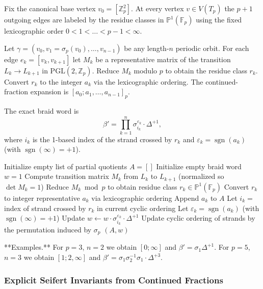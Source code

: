 \documentclass[11pt,a4paper]{amsart}
\begin{document}
Fix the canonical base vertex \(v_0 = [\mathbb{Z}_p^2]\). At every vertex \(v \in V(T_p)\) the \(p+1\) outgoing edges are labeled by the residue classes in \(\mathbb{P}^1(\mathbb{F}_p)\) using the fixed lexicographic order \(0 < 1 < \dots < p-1 < \infty\).

Let \(\gamma = (v_0, v_1 = \sigma_p(v_0), \dots, v_{n-1})\) be any length-\(n\) periodic orbit. For each edge \(e_k = [v_k, v_{k+1}]\) let \(M_k\) be a representative matrix of the transition \(L_k \to L_{k+1}\) in \(\mathrm{PGL}(2,\mathbb{Z}_p)\). Reduce \(M_k\) modulo \(p\) to obtain the residue class \(r_k\). Convert \(r_k\) to the integer \(a_k\) via the lexicographic ordering. The continued-fraction expansion is \([a_0; a_1, \dots, a_{n-1}]_p\).

The exact braid word is
\[
\beta' = \prod_{k=1}^n \sigma_{i_k}^{\varepsilon_k} \cdot \Delta^{+1},
\]
where \(i_k\) is the 1-based index of the strand crossed by \(r_k\) and \(\varepsilon_k = \operatorname{sgn}(a_k)\) (with \(\operatorname{sgn}(\infty)=+1\)).

\begin{algorithmic}[1]
  \State Initialize empty list of partial quotients \(A = []\)
  \State Initialize empty braid word \(w = 1\)
    \State Compute transition matrix \(M_k\) from \(L_k\) to \(L_{k+1}\) (normalized so \(\det M_k = 1\))
    \State Reduce \(M_k \bmod p\) to obtain residue class \(r_k \in \mathbb{P}^1(\mathbb{F}_p)\)
    \State Convert \(r_k\) to integer representative \(a_k\) via lexicographic ordering
    \State Append \(a_k\) to \(A\)
    \State Let \(i_k =\) index of strand crossed by \(r_k\) in current cyclic ordering
    \State Let \(\varepsilon_k = \operatorname{sgn}(a_k)\) (with \(\operatorname{sgn}(\infty)=+1\))
    \State Update \(w \leftarrow w \cdot \sigma_{i_k}^{\varepsilon_k} \cdot \Delta^{+1}\)
    \State Update cyclic ordering of strands by the permutation induced by \(\sigma_p\)
  \EndFor
  \State \Return \((A, w)\)
\EndProcedure
\end{algorithmic}

**Examples.** For \(p=3\), \(n=2\) we obtain \([0;\infty]\) and \(\beta' = \sigma_1 \Delta^{+1}\). For \(p=5\), \(n=3\) we obtain \([1;2,\infty]\) and \(\beta' = \sigma_1 \sigma_2^{-1} \sigma_1 \cdot \Delta^{+3}\).

\subsubsection{Explicit Seifert Invariants from Continued Fractions}
\end{document}
